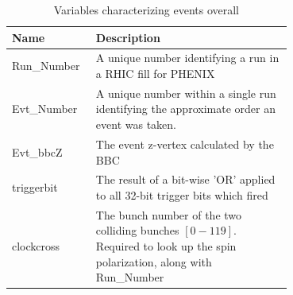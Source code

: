 \begin{table}
  \centering
  \begin{tabular}{l p{0.7\linewidth}}
    \toprule
      \textbf{Name} & \textbf{Description} \\
    \midrule
      Run\_Number & A unique number identifying a run in a RHIC fill for PHENIX \\
      Evt\_Number & A unique number within a single run identifying the approximate order an event was taken. \\
      Evt\_bbcZ & The event z-vertex calculated by the BBC \\
      triggerbit & The result of a bit-wise 'OR' applied to all 32-bit trigger bits which fired \\
    clockcross & The bunch number of the two colliding bunches $[0-119]$. Required to look up the spin polarization, along with Run\_Number \\
    \bottomrule
  \end{tabular}
  \caption{Variables characterizing events overall}
  \label{tab:evt_variables}
\end{table}

